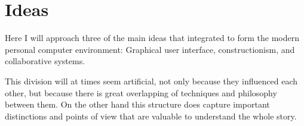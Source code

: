 \section{Ideas}

Here I will approach three of the main ideas that integrated to
form the modern personal computer environment: Graphical user
interface, constructionism, and collaborative systems. 

This division will at times seem artificial, not only because they
influenced each other, but because there is great overlapping of
techniques and philosophy between them. On the other hand this
structure does capture important distinctions and points of view that
are valuable to understand the whole story.




